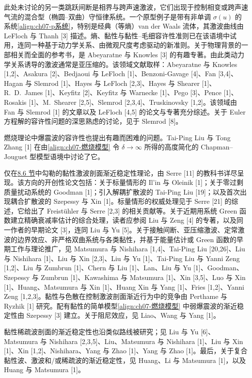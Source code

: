 \documentclass[../../main.tex]{subfiles}
\begin{document}
此处未讨论的另一类跳跃间断是相界与跨声速激波，它们出现于控制相变或跨声速气流的混合型（椭圆--双曲）守恒律系统。一个原型例子是带有非单调 $\sigma(u)$ 的系统\eqref{align:ch07-p系统}，特别是经典（等熵）van der Waals 流体，其激波曲线由 LeFloch 与 Thanh [3] 描述。熵、黏性与黏性--毛细容许性准则已在该语境中试用，连同一种基于动力学关系、由微观尺度考虑驱动的新准则。关于物理背景的一部相关而全面的参考书，是 Abeyaratne 与 Knowles [3] 的有趣专著。由此类动力学关系诱导的激波通常是亚压缩的。该领域文献取样：Abeyaratne 与 Knowles [1,2]、Asakura [2]、Bedjaoui 与 LeFloch [1]、Benzoni-Gavage [4]、Fan [3,4]、Hagan 与 Slemrod [1]、Hayes 与 LeFloch [2,3]、Hayes 与 Shearer [1]、R.\ D.\ James [1]、Keyfitz [2]、Keyfitz 与 Warnecke [1]、Pego [3]、Pence [1]、Rosakis [1]、M.\ Shearer [2,5]、Slemrod [2,3,4]、Truskinovsky [1,2]。该领域由 Fan 与 Slemrod [1] 的文章以及 LeFloch [4,5] 的论文与专著充分综述。关于 Euler 方程解的容许性问题的深思熟虑的讨论，见于 Slemrod [8]。

燃烧理论中爆震波的容许性也提出有趣而困难的问题。Tai-Ping Liu 与 Tong Zhang [1] 在由\eqref{align:ch07-燃烧模型} 令 $\delta\to\infty$ 所得的高度简化的 Chapman--Jouguet 型模型语境中讨论了它。

仅在\hyperref[section:ch08-黏性激波剖面]{8.6 节}中勾勒的黏性激波剖面渐近稳定性理论，由 Serre [11] 的教科书详尽呈现。该方向的开创性论文包括：关于标量情形的 Il'in 与 Oleinik [1]；关于零过剩质量扰动系统的 Goodman [1]；引入解耦扩散波的 Tai-Ping Liu [19]；以及首次出现耦合扩散波的 Szepessy 与 Xin [1]。标量情形的权威处理见于 Serre [21] 的综述，它给出了 Freistühler 与 Serre [2,3] 的相关贡献等。关于近期用系统 Green 函数建立精确衰减率估计的综合处理，读者应参阅 Liu 与 Zeng [4] 的专著，以及同一作者的早期论文 [3]，连同 Liu 与 Yu [5]。关于接触间断、亚压缩激波、定常激波的边界效应、非严格双曲系统与各类黏性，并基于能量估计或 Green 函数的早期工作与理论推广，见 Matsumura 与 Nishihara [1,4]、Tai-Ping Liu [20,26]、Liu 与 Nishihara [1]、Liu 与 Xin [2,3]、Liu 与 Yu [1]、Tai-Ping Liu 与 Yanni Zeng [1,2]、Liu 与 Zumbrun [1]、Chern 与 Liu [1]、Lan、Liu 与 Yu [1]、Goodman、Szepessy 与 Zumbrun [1]、Kawashima 与 Matsumura [1]、Xin [3,5]、Luo 与 Xin [1]、Huang、Matsumura 与 Xin [1]、Huang Xin 与 Yang [1]、Fries [1,2]、Yanni Zeng [1,2,3]。黏性与色散在控制激波剖面渐近行为中的竞争由 Perthame 与 Ryzhik [1] 研究。配有黏性的简单模型\eqref{align:ch07-燃烧模型} 中弱爆震波的渐近稳定性由 Szepessy [3] 建立。关于阻尼效应，见 Liao、Wang 与 Yang [1]。

黏性稀疏波剖面的渐近稳定性也沿类似路线被研究；见 Liu 与 Yu [6]、Matsumura 与 Nishihara [2,3,5]、Liu、Matsumura 与 Nishihara [1]、Liu 与 Xin [1]、Xin [1,2]、Nishihara、Yang 与 Zhao [1]、Yang 与 Zhao [1]。最后，关于复合黏性波、激波和/或稀疏波的渐近稳定性，见 Huang、Li 与 Matsumura [1]，以及 Huang 与 Matsumura [1]。
\end{document}
